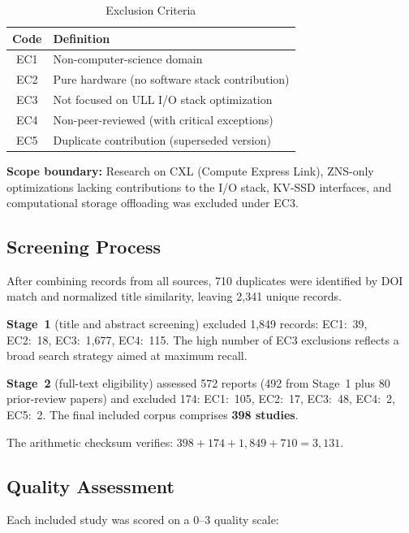 \documentclass[conference]{IEEEtran}
\begin{document}
\begin{table}[t]
\caption{Exclusion Criteria}
\label{tab:exclusion}
\centering
\small
\begin{tabular}{@{}cl@{}}
\toprule
Code & Definition \\
\midrule
EC1 & Non-computer-science domain \\
EC2 & Pure hardware (no software stack contribution) \\
EC3 & Not focused on ULL I/O stack optimization \\
EC4 & Non-peer-reviewed (with critical exceptions) \\
EC5 & Duplicate contribution (superseded version) \\
\bottomrule
\end{tabular}
\end{table}

\noindent
\textbf{Scope boundary:} Research on CXL (Compute Express Link), ZNS-only optimizations lacking contributions to the I/O stack, KV-SSD interfaces, and computational storage offloading was excluded under EC3.

\subsection{Screening Process}

After combining records from all sources, 710 duplicates were identified by DOI match and normalized title similarity, leaving 2{,}341 unique records.

\textbf{Stage~1} (title and abstract screening) excluded 1{,}849 records: EC1:~39, EC2:~18, EC3:~1{,}677, EC4:~115. The high number of EC3 exclusions reflects a broad search strategy aimed at maximum recall.

\textbf{Stage~2} (full-text eligibility) assessed 572 reports (492 from Stage~1 plus 80 prior-review papers) and excluded 174: EC1:~105, EC2:~17, EC3:~48, EC4:~2, EC5:~2. The final included corpus comprises \textbf{398 studies}.

The arithmetic checksum verifies: $398 + 174 + 1{,}849 + 710 = 3{,}131$.

\subsection{Quality Assessment}

Each included study was scored on a 0--3 quality scale:
\end{document}

